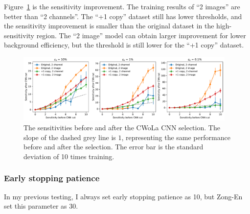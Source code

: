 \documentclass[12pt]{article}
\begin{document}
            Figure~\ref{fig:sensitivity_improvement_bkg_eff_ZN_model} is the sensitivity improvement. The training results of ``2 images'' are better than ``2 channels''. The ``+1 copy'' dataset still has lower thresholds, and the sensitivity improvement is smaller than the original dataset in the high-sensitivity region. The ``2 image'' model can obtain larger improvement for lower background efficiency, but the threshold is still lower for the ``+1 copy'' dataset.
            \begin{figure}[htpb]
                \centering
                \includegraphics[width=0.97\textwidth]{HVmodel_sensitivity_improvement_bkg_eff_origin_copy_1_ZN_model.pdf}
                \caption{The sensitivities before and after the CWoLa CNN selection. The slope of the dashed grey line is $1$, representing the same performance before and after the selection. The error bar is the standard deviation of 10 times training.}
                \label{fig:sensitivity_improvement_bkg_eff_ZN_model}
            \end{figure}
        \subsubsection{Early stopping patience}%
        \label{subs:early_stopping_patience}
            In my previous testing, I always set early stopping patience as 10, but Zong-En set this parameter as 30.
\end{document}
